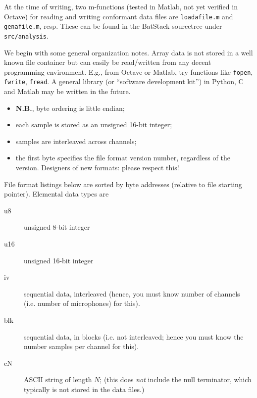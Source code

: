 \documentclass[letterpaper]{article}
\begin{document}
At the time of writing, two m-functions (tested in Matlab, not yet
verified in Octave) for reading and writing conformant data files are
\texttt{loadafile.m} and \texttt{genafile.m}, resp. These can be found
in the BatStack sourcetree under \texttt{src/analysis}.

We begin with some general organization notes. Array data is not
stored in a well known file container but can easily be read/written
from any decent programming environment. E.g., from Octave or Matlab,
try functions like \texttt{fopen}, \texttt{fwrite}, \texttt{fread}. A
general library (or ``software development kit'') in Python, C and
Matlab may be written in the future.
\begin{itemize}
\item \textbf{N.B.}, byte ordering is little endian;
\item each sample is stored as an unsigned 16-bit integer;
\item samples are interleaved across channels;
\item the first byte specifies the file format version number,
  regardless of the version. Designers of new formats: please respect
  this!
\end{itemize}

File format listings below are sorted by byte addresses (relative
to file starting pointer). Elemental data types are
\begin{description}
\item[u8] unsigned 8-bit integer
\item[u16] unsigned 16-bit integer
\item[iv] sequential data, interleaved (hence, you must know number of
  channels (i.e. number of microphones) for this).
\item[blk] sequential data, in blocks (i.e. not interleaved; hence you
  must know the number samples per channel for this).
\item[cN] ASCII string of length $N$; (this does \textit{not} include the null terminator, which typically is not stored in the data files.)
\end{description}
\end{document}
